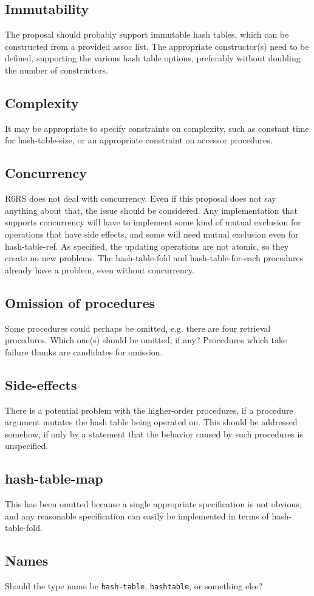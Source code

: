 \documentclass[twoside]{algol60}
\begin{document}
\subsection{Immutability}
The proposal should probably support immutable hash tables, which can be constructed from a provided assoc list.  The appropriate constructor(s) need to be defined, supporting the various hash table options, preferably without doubling the number of constructors.

\subsection{Complexity}
It may be appropriate to specify constraints on complexity, such as constant time for hash-table-size, or an appropriate constraint on accessor procedures.

\subsection{Concurrency}
R6RS does not deal with concurrency.  Even if this proposal does not say anything about that, the issue should be considered.  Any implementation that supports concurrency will have to implement some kind of mutual exclusion for operations that have side effects, and some will need mutual exclusion even for {\cf hash-table-ref}.  As specified, the updating operations are not atomic, so they create no new problems.  The {\cf hash-table-fold} and {\cf hash-table-for-each} procedures already have a problem, even without concurrency.

\subsection{Omission of procedures}
Some procedures could perhaps be omitted, e.g. there are four retrieval procedures.  Which one(s) should be omitted, if any?  Procedures which take failure thunks are candidates for omission.

\subsection{Side-effects}
There is a potential problem with the higher-order procedures, if a procedure argument mutates the hash table being operated on.  This should be addressed somehow, if only by a statement that the behavior caused by such procedures is unspecified.

\subsection{hash-table-map}
This has been omitted because a single appropriate specification is not obvious, and any reasonable specification can easily be implemented in terms of {\cf hash-table-fold}.

\subsection{Names}
Should the type name be {\tt hash-table}, {\tt hashtable}, or something else?


\end{document}
